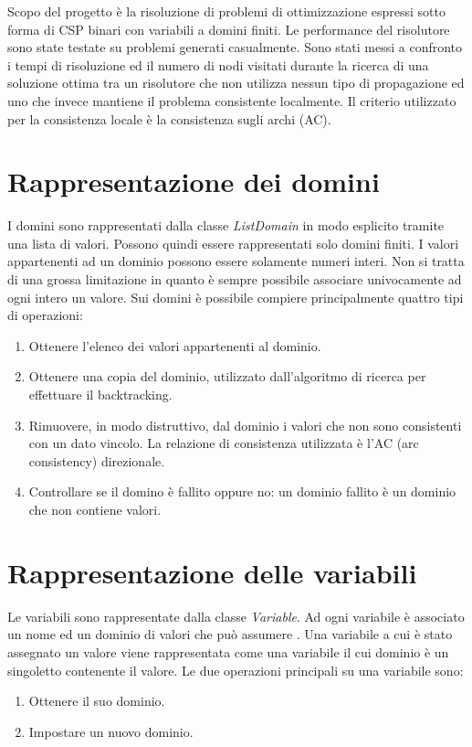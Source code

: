 \documentclass[a4paper,12pt,italian]{article}
\begin{document}
Scopo del progetto \`e la risoluzione di problemi di ottimizzazione
espressi sotto forma di CSP binari con variabili a domini finiti. Le
performance del risolutore sono state testate su problemi generati
casualmente. Sono stati messi a confronto i tempi di risoluzione ed il
numero di nodi visitati durante la ricerca di una soluzione ottima tra
un risolutore che non utilizza nessun tipo di propagazione ed uno che
invece mantiene il problema consistente localmente. Il criterio
utilizzato per la consistenza locale \`e la consistenza sugli archi
(AC).

\section{Rappresentazione dei domini}

I domini sono rappresentati dalla classe \textit{ListDomain} in modo
esplicito tramite una lista di valori. Possono quindi essere
rappresentati solo domini finiti. I valori appartenenti ad un dominio
possono essere solamente numeri interi. Non si tratta di una grossa
limitazione in quanto \`e sempre possibile associare univocamente ad
ogni intero un valore. Sui domini \`e possibile compiere
principalmente quattro tipi di operazioni:

\begin{enumerate}
\item Ottenere l'elenco dei valori appartenenti al dominio.
\item Ottenere una copia del dominio, utilizzato dall'algoritmo di
  ricerca per effettuare il backtracking.
\item Rimuovere, in modo distruttivo, dal dominio i valori che non
  sono consistenti con un dato vincolo. La relazione di consistenza
  utilizzata \`e l'AC (arc consistency) direzionale.
\item Controllare se il domino \`e fallito oppure no: un dominio
  fallito \`e un dominio che non contiene valori.
\end{enumerate}

\section{Rappresentazione delle variabili}

Le variabili sono rappresentate dalla classe \textit{Variable}. Ad
ogni variabile \`e associato un nome ed un dominio di valori che pu\`o
assumere . Una variabile a cui \`e stato assegnato un valore viene
rappresentata come una variabile il cui dominio \`e un singoletto
contenente il valore. Le due operazioni principali su una variabile
sono:
\begin{enumerate}
\item Ottenere il suo dominio.
\item Impostare un nuovo dominio.
\end{enumerate}
\end{document}
